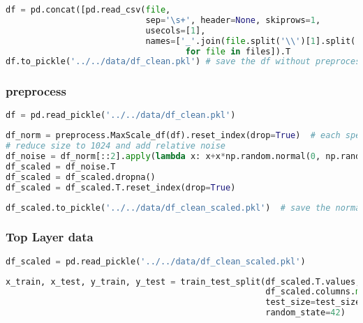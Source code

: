 \begin{lstlisting}[language=Python]
df = pd.concat([pd.read_csv(file,
                            sep='\s+', header=None, skiprows=1,
                            usecols=[1],
                            names=['_'.join(file.split('\\')[1].split('_')[:-1])]).T 
                                    for file in files]).T
df.to_pickle('../../data/df_clean.pkl') # save the df without preprocessing
\end{lstlisting}

\hypertarget{preprocess}{%
\subsubsection*{preprocess}\label{preprocess}}

\begin{lstlisting}[language=Python]
df = pd.read_pickle('../../data/df_clean.pkl') 
\end{lstlisting}

\begin{lstlisting}[language=Python]
df_norm = preprocess.MaxScale_df(df).reset_index(drop=True)  # each spectrum is scaled to 1
# reduce size to 1024 and add relative noise
df_noise = df_norm[::2].apply(lambda x: x+x*np.random.normal(0, np.random.randint(1,3)*0.01 , len(x)))
df_scaled = df_noise.T
df_scaled = df_scaled.dropna()
df_scaled = df_scaled.T.reset_index(drop=True)
\end{lstlisting}

\begin{lstlisting}[language=Python]
df_scaled.to_pickle('../../data/df_clean_scaled.pkl')  # save the normalized, scaled df
\end{lstlisting}

\hypertarget{top-layer-data}{%
\subsubsection*{Top Layer data}\label{top-layer-data}}

\begin{lstlisting}[language=Python]
df_scaled = pd.read_pickle('../../data/df_clean_scaled.pkl')
\end{lstlisting}

\begin{lstlisting}[language=Python]
x_train, x_test, y_train, y_test = train_test_split(df_scaled.T.values,
                                                    df_scaled.columns.map(lambda x: x.split('_')[0]), # first part of the filename is the top label
                                                    test_size=test_size_ratio,
                                                    random_state=42)
\end{lstlisting}

